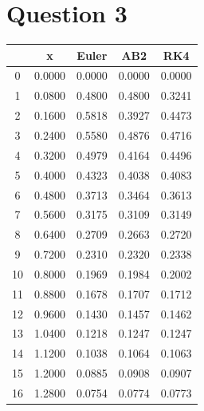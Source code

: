 \documentclass[11pt]{article}
\begin{document}
\section*{Question 3}
\begin{table}[htb]                            
\centering                               
\begin{tabular}{|c|c|c|c|c|}             
\hline                                   
 & x & Euler & AB2 & RK4 \\                      
\hline                                   
0 & 0.0000 & 0.0000 & 0.0000 & 0.0000 \\ 
\hline                                   
1 & 0.0800 & 0.4800 & 0.4800 & 0.3241 \\ 
\hline                                   
2 & 0.1600 & 0.5818 & 0.3927 & 0.4473 \\ 
\hline                                   
3 & 0.2400 & 0.5580 & 0.4876 & 0.4716 \\ 
\hline                                   
4 & 0.3200 & 0.4979 & 0.4164 & 0.4496 \\ 
\hline                                   
5 & 0.4000 & 0.4323 & 0.4038 & 0.4083 \\ 
\hline                                   
6 & 0.4800 & 0.3713 & 0.3464 & 0.3613 \\ 
\hline                                   
7 & 0.5600 & 0.3175 & 0.3109 & 0.3149 \\ 
\hline                                   
8 & 0.6400 & 0.2709 & 0.2663 & 0.2720 \\ 
\hline                                   
9 & 0.7200 & 0.2310 & 0.2320 & 0.2338 \\ 
\hline                                   
10 & 0.8000 & 0.1969 & 0.1984 & 0.2002 \\
\hline                                   
11 & 0.8800 & 0.1678 & 0.1707 & 0.1712 \\
\hline                                   
12 & 0.9600 & 0.1430 & 0.1457 & 0.1462 \\
\hline                                   
13 & 1.0400 & 0.1218 & 0.1247 & 0.1247 \\
\hline                                   
14 & 1.1200 & 0.1038 & 0.1064 & 0.1063 \\
\hline                                   
15 & 1.2000 & 0.0885 & 0.0908 & 0.0907 \\
\hline                                   
16 & 1.2800 & 0.0754 & 0.0774 & 0.0773 \\

\end{tabular}
\end{table}
\end{document}

